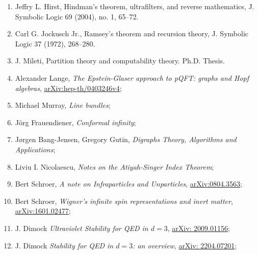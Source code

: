 \documentclass[a4paper,11pt]{article}
\begin{document}
\begin{enumerate}
\item Jeffry L. Hirst, Hindman’s theorem, ultrafilters, and reverse
  mathematics, J. Symbolic Logic 69 (2004), no. 1, 65–72.



\item Carl G. Jockusch Jr., Ramsey’s theorem and recursion theory, J.
  Symbolic Logic 37 (1972), 268–280.



\item J. Mileti, Partition theory and computability theory. Ph.D.
  Thesis.



\item Alexander Lange, \textit{The Epstein-Glaser approach to pQFT:
    graphs and Hopf algebras},
  \href{https://arxiv.org/abs/hep-th/0403246v4}{arXiv:hep-th/0403246v4};



\item Michael Murray, \textit{Line bundles};



\item J\"{o}rg Frauendiener, \textit{Conformal infinity};



\item J\o rgen Bang-Jensen, Gregory Gutin, \textit{Digraphs Theory,
    Algorithms and Applications};



\item Liviu I. Nicolaescu, \textit{Notes on the Atiyah-Singer Index
    Theorem};



\item Bert Schroer, \textit{A note on Infraparticles and Unparticles},
  \href{https://arxiv.org/abs/0804.3563}{arXiv:0804.3563};



\item Bert Schroer, \textit{Wigner's infinite spin representations and
    inert matter},
  \href{https://arxiv.org/abs/1601.02477}{arXiv:1601.02477};



\item J. Dimock \textit{Ultraviolet Stability for QED in $d = 3$},
  \href{https://arxiv.org/abs/2009.01156}{arXiv: 2009.01156};



\item J. Dimock \textit{Stability for QED in $d = 3$: an overview},
  \href{https://arxiv.org/abs/2204.07201}{arXiv: 2204.07201};




\end{enumerate}
\end{document}
